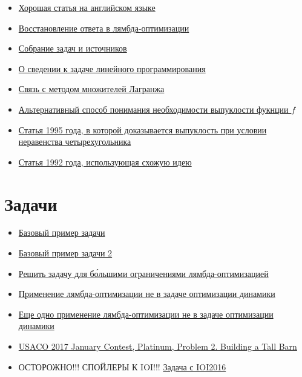 \begin{itemize}
    \item \href{https://mamnoonsiam.github.io/posts/attack-on-aliens.html}{Хорошая статья на английском языке}
    \item \href{https://codeforces.com/blog/entry/92842}{Восстановление ответа в лямбда-оптимизации}
    \item \href{https://usaco.guide/adv/lagrange}{Собрание задач и источников}
    \item \href{https://codeforces.com/blog/entry/68778?#comment-700891}{О сведении к задаче линейного программирования}
    \item \href{https://codeforces.com/blog/entry/68778?#comment-531862}{Связь с методом множителей Лагранжа}
    \item \href{https://codeforces.com/blog/entry/69625?#comment-541307}{Альтернативный способ понимания необходимости выпуклости фукнции $f$}
    \item \href{https://cse.hkust.edu.hk/mjg_lib/bibs/DPSu/DPSu.Files/sdarticle_204.pdf}{Статья 1995 года, в которой доказывается выпуклость при условии неравенства четырехугольника}
    \item \href{https://web.archive.org/web/20210511084902/https://www.osti.gov/servlets/purl/10146169}{Статья 1992 года, использующая схожую идею}
\end{itemize}

\section{Задачи}

\begin{itemize}
    \item \href{https://oj.uz/problem/view/NOI19_feast}{Базовый пример задачи}
    \item \href{https://codeforces.com/contest/1279/problem/F}{Базовый пример задачи 2}
    \item \href{https://codeforces.com/contest/739/problem/E}{Решить задачу для б\'{о}льшими ограничениями лямбда-оптимизацией}
    \item \href{https://open.kattis.com/problems/blazingnewtrails}{Применение лямбда-оптимизации не в задаче оптимизации динамики}
    \item \href{http://81.4.170.42:8980/training/#/task/Tennis/statement}{Еще одно применение лямбда-оптимизации не в задаче оптимизации динамики}
    \item \href{http://www.usaco.org/index.php?page=viewproblem2&cpid=697}{USACO 2017 January Contest, Platinum, Problem 2. Building a Tall Barn}
    \item ОСТОРОЖНО!!! СПОЙЛЕРЫ К IOI!!! \href{https://oj.uz/problem/view/IOI16_aliens}{Задача с IOI2016}
\end{itemize}
